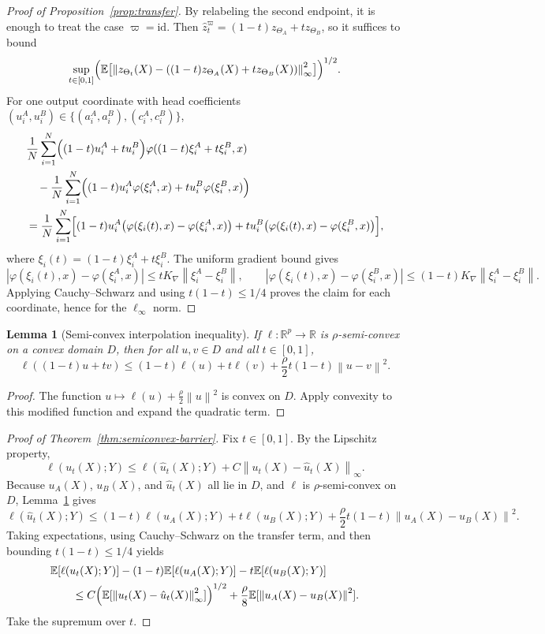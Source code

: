 \documentclass[11pt]{article}
\newtheorem{lemma}[theorem]{Lemma}
\theoremstyle{definition}
\newcommand{\R}{\mathbb{R}}
\newcommand{\E}{\mathbb{E}}
\newcommand{\norm}[1]{\left\lVert #1 \right\rVert}
\newcommand{\abs}[1]{\left\lvert #1 \right\rvert}
\begin{document}
\begin{proof}[Proof of Proposition~\ref{prop:transfer}]
By relabeling the second endpoint, it is enough to treat the case
$\varpi=\mathrm{id}$. Then $\hat z_t^\varpi=(1-t)z_{\Theta_A}+t z_{\Theta_B}$,
so it suffices to bound
\[
  \sup_{t\in[0,1]}
  \Bigl(
    \E\bigl[
      \norm{z_{\Theta_t}(X)-((1-t)z_{\Theta_A}(X)+t z_{\Theta_B}(X))}_\infty^2
    \bigr]
  \Bigr)^{1/2}.
\]
For one output coordinate with head coefficients $(u_i^A,u_i^B)\in\{(a_i^A,a_i^B),
(c_i^A,c_i^B)\}$,
\begin{align*}
  &\frac1N\sum_{i=1}^N \Bigl((1-t)u_i^A+t u_i^B\Bigr)\varphi((1-t)\xi_i^A+t\xi_i^B,x)
  \\
  &\quad-
  \frac1N\sum_{i=1}^N
  \Bigl(
    (1-t)u_i^A\varphi(\xi_i^A,x)+t u_i^B\varphi(\xi_i^B,x)
  \Bigr)
  \\
  &=
  \frac1N\sum_{i=1}^N
  \Bigl[
    (1-t)u_i^A\bigl(\varphi(\xi_i(t),x)-\varphi(\xi_i^A,x)\bigr)
    +
    t u_i^B\bigl(\varphi(\xi_i(t),x)-\varphi(\xi_i^B,x)\bigr)
  \Bigr],
\end{align*}
where $\xi_i(t)=(1-t)\xi_i^A+t\xi_i^B$. The uniform gradient bound gives
\[
  \abs{\varphi(\xi_i(t),x)-\varphi(\xi_i^A,x)}
  \le
  tK_\nabla\norm{\xi_i^A-\xi_i^B},
  \qquad
  \abs{\varphi(\xi_i(t),x)-\varphi(\xi_i^B,x)}
  \le
  (1-t)K_\nabla\norm{\xi_i^A-\xi_i^B}.
\]
Applying Cauchy--Schwarz and using $t(1-t)\le 1/4$ proves the claim for each
coordinate, hence for the $\ell_\infty$ norm.
\end{proof}

\begin{lemma}[Semi-convex interpolation inequality]
\label{lem:semi-convex}
If $\ell:\R^p\to\R$ is $\rho$-semi-convex on a convex domain $D$, then for all
$u,v\in D$ and all $t\in[0,1]$,
\[
  \ell((1-t)u+t v)
  \le
  (1-t)\ell(u)+t\ell(v)+\frac{\rho}{2}t(1-t)\norm{u-v}^2.
\]
\end{lemma}

\begin{proof}
The function $u\mapsto \ell(u)+\frac{\rho}{2}\norm{u}^2$ is convex on $D$.
Apply convexity to this modified function and expand the quadratic term.
\end{proof}

\begin{proof}[Proof of Theorem~\ref{thm:semiconvex-barrier}]
Fix $t\in[0,1]$. By the Lipschitz property,
\[
  \ell(u_t(X);Y)
  \le
  \ell(\hat u_t(X);Y)+C\norm{u_t(X)-\hat u_t(X)}_\infty.
\]
Because $u_A(X)$, $u_B(X)$, and $\hat u_t(X)$ all lie in $D$, and $\ell$ is
$\rho$-semi-convex on $D$, Lemma~\ref{lem:semi-convex} gives
\[
  \ell(\hat u_t(X);Y)
  \le
  (1-t)\ell(u_A(X);Y)
  +
  t\ell(u_B(X);Y)
  +
  \frac{\rho}{2}t(1-t)\norm{u_A(X)-u_B(X)}^2.
\]
Taking expectations, using Cauchy--Schwarz on the transfer term, and then
bounding $t(1-t)\le 1/4$ yields
\begin{align*}
  &\E[\ell(u_t(X);Y)]
  -
  (1-t)\E[\ell(u_A(X);Y)]
  -
  t\E[\ell(u_B(X);Y)]
  \\
  &\qquad\le
  C
  \Bigl(
    \E[\norm{u_t(X)-\hat u_t(X)}_\infty^2]
  \Bigr)^{1/2}
  +
  \frac{\rho}{8}\E[\norm{u_A(X)-u_B(X)}^2].
\end{align*}
Take the supremum over $t$.
\end{proof}
\end{document}
